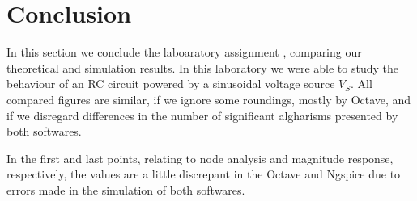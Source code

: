 \section{Conclusion}
\label{sec:conclusion}


In this section we conclude the laboaratory assignment , comparing our theoretical and simulation results. 
In this laboratory we were able to study the behaviour of an RC circuit powered by a sinusoidal voltage source $V_S$.
All compared figures are similar, if we ignore some roundings, mostly by Octave, and if we disregard differences in the number of significant algharisms presented by both softwares.  

In the first and last points, relating to node analysis and  magnitude response, respectively, the values are a little discrepant in the Octave and Ngspice due to errors made in the simulation of both softwares.

